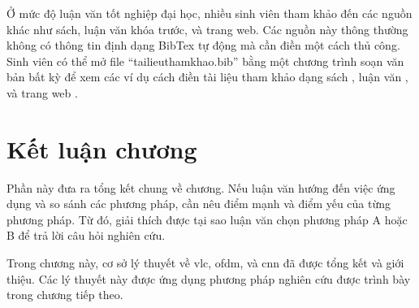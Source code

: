 	Ở mức độ luận văn tốt nghiệp đại học, nhiều sinh viên tham khảo đến các nguồn khác như sách, luận văn khóa trước, và trang web.
	Các nguồn này thông thường không có thông tin định dạng BibTex tự động mà cần điền một cách thủ công.
	Sinh viên có thể mở file ``tailieuthamkhao.bib'' bằng một chương trình soạn văn bản bất kỳ để xem các ví dụ cách điền tài liệu tham khảo dạng sách \cite{IEEEexample:book_typical}, luận văn \cite{IEEEexample:masterstype}, và trang web \cite{IEEEexample:IEEEwebsite}.
	
\section{Kết luận chương}

	Phần này đưa ra tổng kết chung về chương. 
	Nếu luận văn hướng đến việc ứng dụng và so sánh các phương pháp, cần nêu điểm mạnh và điểm yếu của từng phương pháp. 
	Từ đó, giải thích được tại sao luận văn chọn phương pháp A hoặc B để trả lời câu hỏi nghiên cứu.
	
	\begin{exam}
	Trong chương này, cơ sở lý thuyết về \ac{vlc}, \ac{ofdm}, và \ac{cnn} đã được tổng kết và giới thiệu.
	Các lý thuyết này được ứng dụng phương pháp nghiên cứu được trình bày trong chương tiếp theo.
	\end{exam}